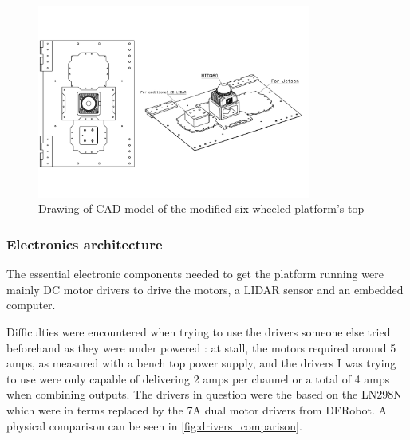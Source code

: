 \documentclass[11pt]{article}
\begin{document}
        \begin{figure}[htbp]
            \centering
            \includegraphics[width=0.8\textwidth]{Images/RoverV1.pdf}
            \caption{Drawing of CAD model of the modified six-wheeled platform's top}
            \label{fig:full_cad_model}
        \end{figure}

        \subsubsection{Electronics architecture}
            The essential electronic components needed to get the platform running were mainly DC motor drivers to drive the motors, a LIDAR sensor and an embedded computer.
            
            Difficulties were encountered when trying to use the drivers someone else tried beforehand as they were under powered : at stall, the motors required around 5 amps, as measured with a bench top power supply, and the drivers I was trying to use were only capable of delivering 2 amps per channel or a total of 4 amps when combining outputs. The drivers in question were the based on the LN298N which were in terms replaced by the 7A dual motor drivers from DFRobot. A physical comparison can be seen in \ref{fig:drivers_comparison}.
        
\end{document}
